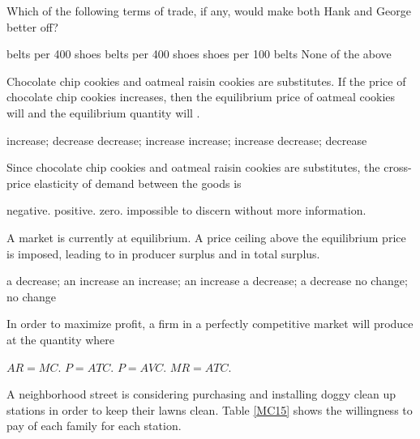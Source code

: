 \documentclass[addpoints,11pt]{exam}
\theoremstyle{definition}
\newcommand{\blank}[0]{\underline{\hspace{3cm}}}
\begin{document}
\begin{questions}
\question \label{q10} Which of the following terms of trade, if any, would make both Hank and George better off?

\begin{choices}
	 belts per 400 shoes
	 belts per 400 shoes
	 shoes per 100 belts
	\choice None of the above
\end{choices}
	

	\question Chocolate chip cookies and oatmeal raisin cookies are substitutes. If the price of chocolate chip cookies increases, then the equilibrium price of oatmeal cookies will \blank and the equilibrium quantity will \blank.
	
	\begin{choices}
			\choice increase; decrease
			\choice decrease; increase
			\CorrectChoice increase; increase
			\choice decrease; decrease
	\end{choices}
	


	\question Since chocolate chip cookies and oatmeal raisin cookies are substitutes, the cross-price elasticity of demand between the goods is 
	
	\begin{choices}
		\choice negative.
		\CorrectChoice positive.
		\choice zero.
		\choice impossible to discern without more information.
	\end{choices}
	

\question A market is currently at equilibrium. A price ceiling above the equilibrium price is imposed, leading to \underline{\hspace{3cm}} in producer surplus and \underline{\hspace{3cm}} in total surplus.
	
	\begin{choices}
			\choice a decrease; an increase
			\choice an increase; an increase
			\choice a decrease; a decrease
			\CorrectChoice no change; no change
	\end{choices}
	

	
\question In order to maximize profit, a firm in a perfectly competitive market will produce at the quantity where

\begin{choices}
	\CorrectChoice $AR = MC$.
	\choice $P = ATC$.
	\choice $P = AVC$.
	\choice $MR = ATC$.
\end{choices}

	
\question  A neighborhood street is considering purchasing and installing doggy clean up stations in order to keep their lawns clean. Table \ref{MC15} shows the willingness to pay of each family for each station.


\end{questions}
\end{document}
